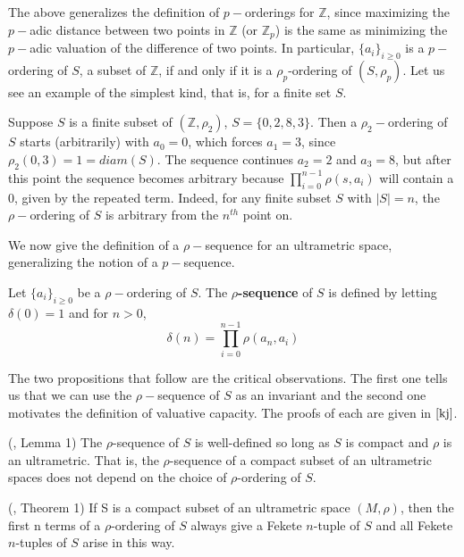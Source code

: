 The above generalizes the definition of $p-$orderings for $\mathbb{Z}$, since maximizing the $p-$adic distance between two points in $\mathbb{Z}$ (or $\mathbb{Z}_p$) is the same as minimizing the $p-$adic valuation of the difference of two points. In particular, $\{a_i\}_{i \geq 0}$ is a $p-$ordering of $S$, a subset of $\mathbb{Z}$, if and only if it is a $\rho_p$-ordering of $(S, \rho_p)$. Let us see an example of the simplest kind, that is, for a finite set $S$.\\

\begin{example}
Suppose $S$ is a finite subset of $(\mathbb{Z}, \rho_2)$, $S=\{0,2,8,3\}$. Then a $\rho_2-$ordering of $S$ starts (arbitrarily) with $a_0=0$, which forces $a_1=3$, since $\rho_2(0,3)=1=diam(S)$. The sequence continues $a_2=2$ and $a_3=8$, but after this point the sequence becomes arbitrary because  $\prod_{i=0}^{n-1} \rho(s,a_i)$ will contain a $0$, given by the repeated term. Indeed, for any finite subset $S$ with $\lvert S \rvert = n$, the $\rho-$ordering of $S$ is arbitrary from the $n^{th}$ point on. 
\end{example}

We now give the definition of a $\rho-$sequence for an ultrametric space, generalizing the notion of a $p-$sequence.\\

\begin{definition}
	\cite{kj} Let $\{a_i\}_{i \geq 0}$ be a $\rho-$ordering of $S$. The \textbf{$\rho$-sequence} of $S$ is defined by letting $\delta(0)=1$  and for $n > 0$, \[\delta(n)=\prod_{i=0}^{n-1} \rho(a_n,a_i)\]
\end{definition}

The two propositions that follow are the critical observations. The first one tells us that we can use the $\rho-$sequence of $S$ as an invariant and the second one motivates the definition of valuative capacity. The proofs of each are given in $\cite{kj}$.\\

\begin{proposition}
	(\cite{kj}, Lemma 1) The $\rho$-sequence of $S$ is well-defined so long as $S$ is compact and $\rho$ is an ultrametric. That is, the $\rho$-sequence of a compact subset of an ultrametric spaces does not depend on the choice of $\rho$-ordering of $S$.
\end{proposition}

\begin{proposition} (\cite{kj}, Theorem 1)
If S is a compact subset of an ultrametric space $(M, \rho)$, then the first n terms of a $\rho$-ordering of $S$ always give a Fekete $n$-tuple of $S$ and all Fekete $n$-tuples of $S$ arise in this way.
\end{proposition}

